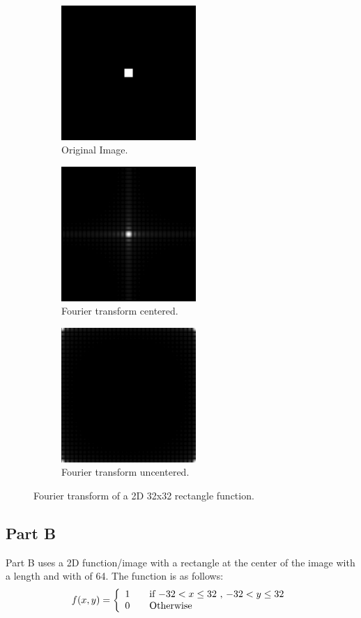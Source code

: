 \documentclass[letter]{article}
\begin{document}
\begin{figure}[hbtp]
  \centering
  \begin{subfigure}{5.1cm}
    \includegraphics[width=5.1cm]{images/rect_512_32x32.png}
    \caption{Original Image.}
  \end{subfigure}
  \begin{subfigure}{5.1cm}
    \includegraphics[width=5.1cm]{images/rect_512_32x32_FU_centered.png}
    \caption{Fourier transform centered.}
  \end{subfigure}
  \begin{subfigure}{5.1cm}
    \includegraphics[width=5.1cm]{images/rect_512_32x32_FU.png}
    \caption{Fourier transform uncentered.}
  \end{subfigure}
  \caption{Fourier transform of a 2D 32x32 rectangle function.}
  \label{fig:ft_3232}
\end{figure}
\subsection{Part B}
Part B uses a 2D function/image with a rectangle at the center of the image with a length and with of 64. The function is as follows: $$f(x,y) = \left \{ \begin{array}{l l} 1 & \quad \text{if $-32 < x \leq 32$ , $-32 < y \leq 32$}\\ 0 & \quad \text{Otherwise}\end{array} \right.$$
\end{document}

